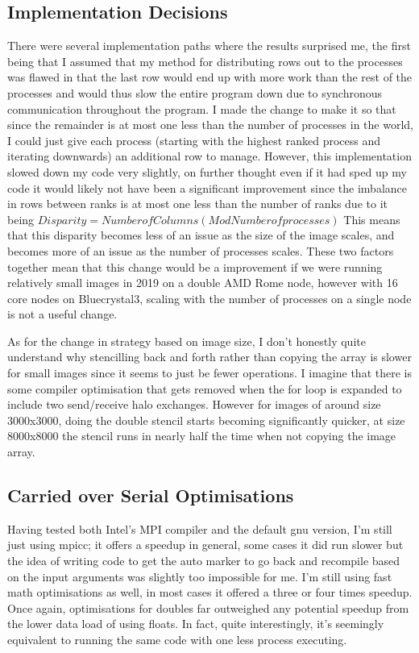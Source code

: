 \documentclass[10pt]{article}
\begin{document}
    \subsection{Implementation Decisions}
    There were several implementation paths where the results surprised me, the first being that
    I assumed that my method for distributing rows out to the processes was flawed in that the
    last row would end up with more work than the rest of the processes and would thus slow the
    entire program down due to synchronous communication throughout the program. I made the change
    to make it so that since the remainder is at most one less than the number of processes in the
    world, I could just give each process (starting with the highest ranked process and iterating downwards)
    an additional row to manage. However, this implementation slowed down my code very slightly, on further
    thought even if it had sped up my code it would likely not have been a significant improvement since the
    imbalance in rows between ranks is at most one less than the number of ranks due to it being
    $Disparity = Number of Columns (Mod Number of processes)$
    This means that this disparity becomes less of an issue as the size of the image scales, and becomes
    more of an issue as the number of processes scales. These two factors together mean that this change would
    be a improvement if we were running relatively small images in 2019 on a double AMD Rome node, however
    with 16 core nodes on Bluecrystal3, scaling with the number of processes on a single node is not a
    useful change.

    As for the change in strategy based on image size, I don't honestly quite understand why stencilling back
    and forth rather than copying the array is slower for small images since it seems to just be fewer operations.
    I imagine that there is some compiler optimisation that gets removed when the for loop is expanded to include
    two send/receive halo exchanges. However for images of around size 3000x3000, doing the double stencil starts
    becoming significantly quicker, at size 8000x8000 the stencil runs in nearly half the time when not copying the
    image array.

    \subsection{Carried over Serial Optimisations}
    Having tested both Intel's MPI compiler and the default gnu version, I'm still just using mpicc; it offers a speedup in
    general, some cases it did run slower but the idea of writing code to get the auto marker to go back and recompile based
    on the input arguments was slightly too impossible for me.
    I'm still using fast math optimisations as well, in most cases it offered a three or four times speedup.
    Once again, optimisations for doubles far outweighed any potential speedup from the lower data load of using floats. In fact,
    quite interestingly, it's seemingly equivalent to running the same code with one less process executing.
\end{document}
